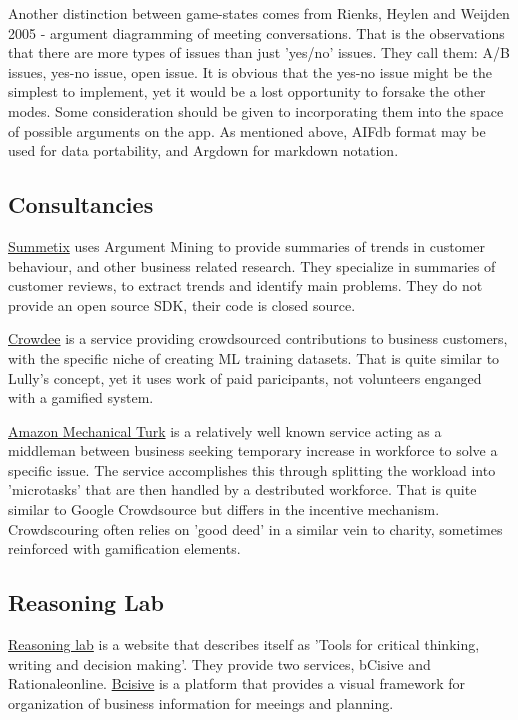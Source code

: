 \documentclass{article}
\begin{document}
Another distinction between game-states comes from Rienks, Heylen and Weijden 2005 - argument diagramming of meeting conversations.
That is the observations that there are more types of issues than just 'yes/no' issues.
They call them: A/B issues, yes-no issue, open issue.
It is obvious that the yes-no issue might be the simplest to implement, yet it would be a lost opportunity to forsake the other modes.
Some consideration should be given to incorporating them into the space of possible arguments on the app.
As mentioned above, AIFdb format may be used for data portability, and Argdown for markdown notation.

\subsection{Consultancies}
\href{https://www.summetix.com/}{Summetix} uses Argument Mining to provide summaries of trends in customer behaviour, and other business related research. They specialize in summaries of customer reviews, to extract trends and identify main problems. They do not provide an open source SDK, their code is closed source.

\href{https://www.crowdee.com/}{Crowdee} is a service providing crowdsourced contributions to business customers, with the specific niche of creating ML training datasets. That is quite similar to Lully's concept, yet it uses work of paid paricipants, not volunteers enganged with a gamified system.

\href{https://www.mturk.com/}{Amazon Mechanical Turk} is a relatively well known service acting as a middleman between business seeking temporary increase in workforce to solve a specific issue.
The service accomplishes this through splitting the workload into 'microtasks' that are then handled by a destributed workforce. That is quite similar to Google Crowdsource but differs in the incentive mechanism. Crowdscouring often relies on 'good deed' in a similar vein to charity, sometimes reinforced with gamification elements.

\subsection{Reasoning Lab}
\href{https://www.reasoninglab.com/argument-mapping/}{Reasoning lab} is a website that describes itself as 'Tools for critical thinking, writing and decision making'. They provide two services, bCisive and Rationaleonline.
\href{https://www.reasoninglab.com/bcisive-2/}{Bcisive} is a platform that provides a visual framework for organization of business information for meeings and planning.
\end{document}
